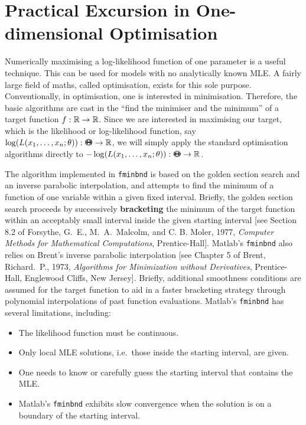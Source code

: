 \newpage

\section{Practical Excursion in One-dimensional Optimisation}
Numerically maximising a log-likelihood function of one parameter is a useful technique.  This can be used for models with no analytically known MLE.  A fairly large field of maths, called optimisation, exists for this sole purpose.  Conventionally, in optimisation, one is interested in minimisation.  Therefore, the basic algorithms are cast in the ``find the minimiser and the minimum'' of a target function $f:\mathbb{R} \to \mathbb{R}$.  Since we are interested in maximising our target, which is the likelihood or log-likelihood function, say $\log(L(x_1,\ldots,x_n; \theta)): {\Theta}\mspace{-11 mu}{\Theta} \to \mathbb{R}$, we will simply apply the standard optimisation algorithms directly to $-\log(L(x_1,\ldots,x_n; \theta)):{\Theta}\mspace{-11 mu}{\Theta}\to \mathbb{R}$.

The algorithm implemented in {\tt fminbnd} is based on the golden section search and an inverse parabolic interpolation, and attempts to find the minimum of a function of one variable within a given fixed interval.  Briefly, the golden section search proceeds by successively {\bf bracketing} the minimum of the target function within an acceptably small interval inside the given starting interval [see Section 8.2 of Forsythe, G.~E., M.~A.~Malcolm, and C. B. Moler, 1977, {\em Computer Methods for Mathematical Computations}, Prentice-Hall].  {\sc Matlab}'s {\tt fminbnd} also relies on Brent's inverse parabolic interpolation [see Chapter 5 of Brent, Richard.~P., 1973, {\em Algorithms for Minimization without Derivatives}, Prentice-Hall, Englewood Cliffs, New Jersey].  Briefly, additional smoothness conditions are assumed for the target function to aid in a faster bracketing strategy through polynomial interpolations of past function evaluations.  {\sc Matlab}'s {\tt fminbnd} has several limitations, including:
\begin{itemize}
\item The likelihood function must be continuous. 
\item Only local MLE solutions, i.e.~those inside the starting interval, are given.
\item One needs to know or carefully guess the starting interval that contains the MLE.
\item {\sc Matlab}'s {\tt fminbnd} exhibits slow convergence when the solution is on a boundary of the starting interval.
\end{itemize}

